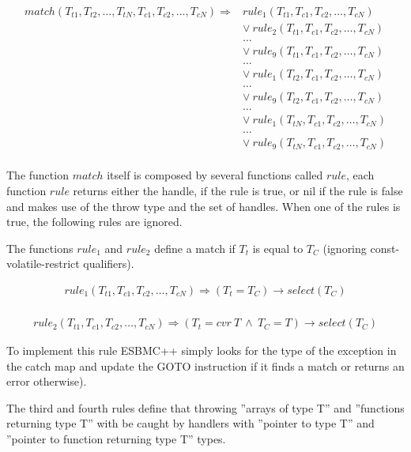 \documentclass[conference]{IEEEtran}
\begin{document}
{\[\begin{array}{ll}
match(T_{t1}, T_{t2}, \ldots, T_{tN}, T_{c1}, T_{c2}, \ldots, T_{cN}) \Longrightarrow & rule_1(T_{t1},T_{c1}, T_{c2}, \ldots, T_{cN}) \\
  & \vee \: rule_2(T_{t1},T_{c1}, T_{c2}, \ldots, T_{cN}) \\
  & \ldots \\
  & \vee \: rule_9(T_{t1},T_{c1}, T_{c2}, \ldots, T_{cN}) \\
  & \ldots \\
  & \vee \: rule_1(T_{t2},T_{c1}, T_{c2}, \ldots, T_{cN}) \\
  & \ldots \\
  & \vee \: rule_9(T_{t2},T_{c1}, T_{c2}, \ldots, T_{cN}) \\
  & \ldots \\
  & \vee \: rule_1(T_{tN},T_{c1}, T_{c2}, \ldots, T_{cN}) \\
  & \ldots \\
  & \vee \: rule_9(T_{tN},T_{c1}, T_{c2}, \ldots, T_{cN}) \\
\end{array}\]

The function $match$ itself is composed by several functions called $rule$,
each function $rule$ returns either the handle, if the rule is true, or nil
if the rule is false and makes use of the throw type and the set of handles.
When one of the rules is true, the following rules are ignored.

The functions $rule_1$ and $rule_2$ define a match if $T_{t}$ is equal to $T_{C}$ (ignoring
const-volatile-restrict qualifiers).

\[\begin{array}{ll}
rule_1(T_{t1},T_{c1}, T_{c2}, \ldots, T_{cN}) \Longrightarrow
  (T_{t} = T_{C})\rightarrow select(T_{C}) \\
\end{array}\]

\[\begin{array}{ll}
rule_2(T_{t1},T_{c1}, T_{c2}, \ldots, T_{cN}) \Longrightarrow
  (T_{t} = cvr \: T \: \wedge \: T_{C} = T)\rightarrow select(T_{C})
\end{array}\]

To implement this rule ESBMC++ simply looks for the type of the exception
in the catch map and update the GOTO instruction if it finds a match or
returns an error otherwise).

The third and fourth rules define that throwing ''arrays of type T'' and
''functions returning type T'' with be caught by handlers with
''pointer to type T'' and ''pointer to function returning type T'' types.

}
\end{document}
